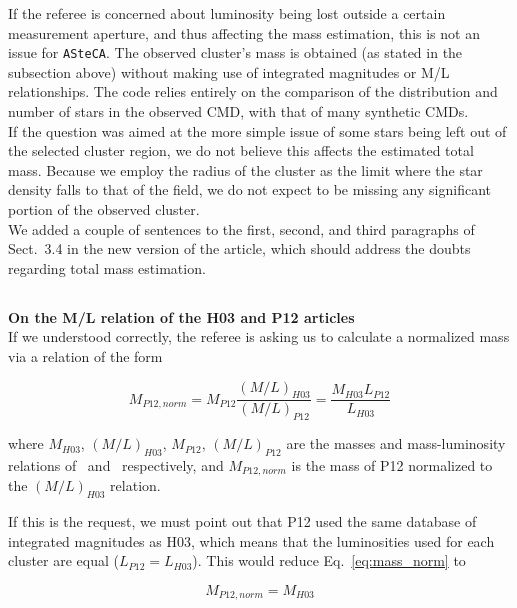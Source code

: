 \documentclass{article}
\begin{document}
If the referee is concerned about luminosity being lost outside a certain
measurement aperture, and thus affecting the mass estimation, this is not an
issue for \texttt{ASteCA}. The observed cluster's mass is obtained (as stated
in the subsection above) without making use of integrated magnitudes or M/L
relationships. The code relies entirely on the comparison of the distribution
and number of stars in the observed CMD, with that of many synthetic CMDs.\\

If the question was aimed at the more simple issue of some stars being left
out of the selected cluster region, we do not believe this affects the estimated
total mass.
Because we employ the radius of the cluster as the limit where the star density
falls to that of the field, we do not expect to be missing any significant
portion of the observed cluster.\\

We added a couple of sentences to the first, second, and third paragraphs of
Sect.~3.4 in the new version of the article, which should address the doubts
regarding total mass estimation.


\subsection{}
\label{sec:19}
\textbf{On the M/L relation of the H03 and P12 articles}\\

If we understood correctly, the referee is asking us to calculate a
normalized mass via a relation of the form

\begin{equation}
M_{P12,norm} = M_{P12} \frac{(M/L)_{H03}}{(M/L)_{P12}} =
\frac{M_{H03} L_{P12}}{L_{H03}}
\label{eq:mass_norm}
\end{equation}

\noindent where $M_{H03}$, $(M/L)_{H03}$, $M_{P12}$, $(M/L)_{P12}$ are the
masses and mass-luminosity relations of~\citet[][H03]{Hunter_2003}
and~\citet[][P12]{Popescu_2012} respectively, and
$M_{P12,norm}$ is the mass of P12 normalized to the $(M/L)_{H03}$ relation.

If this is the request, we must point out that P12 used the same database of
integrated magnitudes as H03, which means that the luminosities used for each
cluster are equal ($L_{P12}=L_{H03}$). This would reduce Eq.~\ref{eq:mass_norm}
to

\begin{equation}
M_{P12,norm} = M_{H03}
\end{equation}
\end{document}
